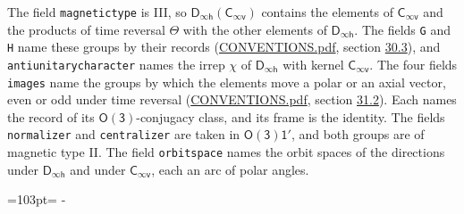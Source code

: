 \documentclass[10pt,a4paper]{article}
\newcommand{\needspace}[1]{\par\penalty-100\begingroup\dimen0=#1\relax\dimen2=\pagegoal
  \advance\dimen2-\pagetotal\ifdim\dimen0>\dimen2\relax\ifdim\dimen2>0pt\vfil\break\fi\fi
  \endgroup}
\numberwithin{equation}{section}
\newcommand{\grp}[1]{\mathsf{#1}}
\begin{document}
The field \texttt{magnetictype} is III, so $\grp{D_{\infty h}}(\grp{C_{\infty v}})$ contains the elements of $\grp{C_{\infty v}}$ and the products of time reversal $\varTheta$ with the other elements of $\grp{D_{\infty h}}$. The fields \texttt{G} and \texttt{H} name these groups by their records (\href{../../CONVENTIONS.pdf}{CONVENTIONS.pdf}, section \href{../../CONVENTIONS.pdf\#conv.30.3}{30.3}), and \texttt{antiunitarycharacter} names the irrep $\chi$ of $\grp{D_{\infty h}}$ with kernel $\grp{C_{\infty v}}$. The four fields \texttt{images} name the groups by which the elements move a polar or an axial vector, even or odd under time reversal (\href{../../CONVENTIONS.pdf}{CONVENTIONS.pdf}, section \href{../../CONVENTIONS.pdf\#conv.31.2}{31.2}). Each names the record of its $\grp{O(3)}$-conjugacy class, and its frame is the identity. The fields \texttt{normalizer} and \texttt{centralizer} are taken in $\grp{O(3)1'}$, and both groups are of magnetic type II. The field \texttt{orbitspace} names the orbit spaces of the directions under $\grp{D_{\infty h}}$ and under $\grp{C_{\infty v}}$, each an arc of polar angles.
\needspace{103pt}
\end{document}
